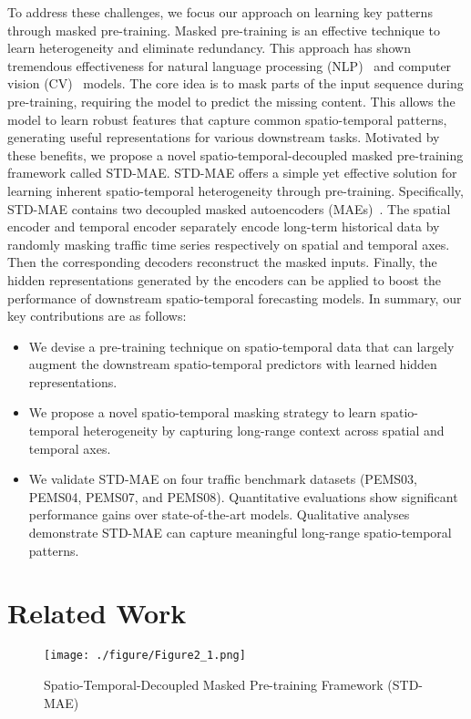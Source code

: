 \documentclass[letterpaper]{article} \usepackage{aaai24}  \usepackage{times}  \usepackage{helvet}  \usepackage{courier}  \usepackage[hyphens]{url}  \usepackage{graphicx} \urlstyle{rm} \def\UrlFont{\rm}  \usepackage{natbib}  \usepackage{caption} \frenchspacing  \setlength{\pdfpagewidth}{8.5in} \setlength{\pdfpageheight}{11in} \usepackage{algorithm}
\begin{document}
To address these challenges, we focus our approach on learning key patterns through masked pre-training. Masked pre-training is an effective technique to learn heterogeneity and eliminate redundancy. This approach has shown tremendous effectiveness for natural language processing (NLP)~\cite{kenton2019bert} and computer vision (CV)~\cite{bao2021beit} models. The core idea is to mask parts of the input sequence during pre-training, requiring the model to predict the missing content. This allows the model to learn robust features that capture common spatio-temporal patterns, generating useful representations for various downstream tasks. Motivated by these benefits, we propose a novel spatio-temporal-decoupled masked pre-training framework called STD-MAE. STD-MAE offers a simple yet effective solution for learning inherent spatio-temporal heterogeneity through pre-training. Specifically, STD-MAE contains two decoupled masked autoencoders (MAEs)~\cite{he2022masked}. The spatial encoder and temporal encoder separately encode long-term historical data by randomly masking traffic time series respectively on spatial and temporal axes. Then the corresponding decoders reconstruct the masked inputs. Finally, the hidden representations generated by the encoders can be applied to boost the performance of downstream spatio-temporal forecasting models. In summary, our key contributions are as follows:
\begin{itemize}
    \item We devise a pre-training technique on spatio-temporal data that can largely augment the downstream spatio-temporal predictors with learned hidden representations. \item We propose a novel spatio-temporal masking strategy to learn spatio-temporal heterogeneity by capturing long-range context across spatial and temporal axes.
    \item We validate STD-MAE on four traffic benchmark datasets (PEMS03, PEMS04, PEMS07, and PEMS08). Quantitative evaluations show significant performance gains over state-of-the-art models. Qualitative analyses demonstrate STD-MAE can capture meaningful long-range spatio-temporal patterns.
\end{itemize}



\section{Related Work}
\begin{figure*}[t]
	\centering
\texttt{[image: ./figure/Figure2\_1.png]}
	\caption{Spatio-Temporal-Decoupled Masked Pre-training Framework (STD-MAE)}
	\label{fig:architecture}
\end{figure*}
\end{document}
